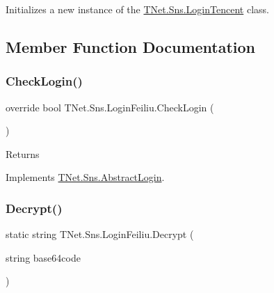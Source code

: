 Initializes a new instance of the \mbox{\hyperlink{class_t_net_1_1_sns_1_1_login_tencent}{T\+Net.\+Sns.\+Login\+Tencent}} class. 



\subsection{Member Function Documentation}
\mbox{\label{class_t_net_1_1_sns_1_1_login_feiliu_a05c5de3660d07218535a0dd4fb77c748}} 
\subsubsection{\texorpdfstring{Check\+Login()}{CheckLogin()}}
{\footnotesize\ttfamily override bool T\+Net.\+Sns.\+Login\+Feiliu.\+Check\+Login (\begin{DoxyParamCaption}{ }\end{DoxyParamCaption})\hspace{0.3cm}{\ttfamily [virtual]}}





\begin{DoxyReturn}{Returns}

\end{DoxyReturn}


Implements \mbox{\hyperlink{class_t_net_1_1_sns_1_1_abstract_login_a6b5dac3d6d46efb7b1e4049e674105e5}{T\+Net.\+Sns.\+Abstract\+Login}}.

\mbox{\label{class_t_net_1_1_sns_1_1_login_feiliu_ae6b8cfcd5df3f335a47c19566f5b045f}} 
\subsubsection{\texorpdfstring{Decrypt()}{Decrypt()}}
{\footnotesize\ttfamily static string T\+Net.\+Sns.\+Login\+Feiliu.\+Decrypt (\begin{DoxyParamCaption}\item[{string}]{base64code }\end{DoxyParamCaption})\hspace{0.3cm}{\ttfamily [static]}}



